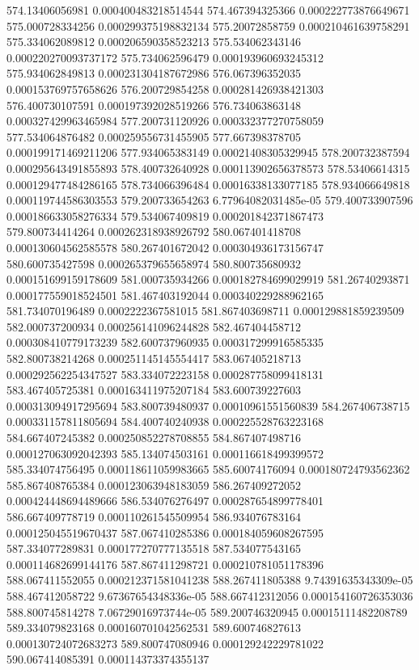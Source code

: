 {574.13406056981 0.000400483218514544
574.467394325366 0.000222773876649671
575.000728334256 0.000299375198832134
575.20072858759 0.000210461639758291
575.334062089812 0.000206590358523213
575.534062343146 0.000220270093737172
575.734062596479 0.000193960693245312
575.934062849813 0.000231304187672986
576.067396352035 0.000153769757658626
576.200729854258 0.000281426938421303
576.400730107591 0.000197392028519266
576.734063863148 0.000327429963465984
577.200731120926 0.000332377270758059
577.534064876482 0.000259556731455905
577.667398378705 0.000199171469211206
577.934065383149 0.00021408305329945
578.200732387594 0.000295643491855893
578.400732640928 0.000113902656378573
578.53406614315 0.000129477484286165
578.734066396484 0.00016338133077185
578.934066649818 0.000119744586303553
579.200733654263 6.77964082031485e-05
579.400733907596 0.000186633058276334
579.534067409819 0.000201842371867473
579.800734414264 0.000262318938926792
580.067401418708 0.000130604562585578
580.267401672042 0.000304936173156747
580.600735427598 0.000265379655658974
580.800735680932 0.000151699159178609
581.000735934266 0.000182784699029919
581.26740293871 0.000177559018524501
581.467403192044 0.000340229288962165
581.734070196489 0.0002222367581015
581.867403698711 0.000129881859239509
582.000737200934 0.000256141096244828
582.467404458712 0.000308410779173239
582.600737960935 0.000317299916585335
582.800738214268 0.000251145145554417
583.067405218713 0.000292562254347527
583.334072223158 0.000287758099418131
583.467405725381 0.000163411975207184
583.600739227603 0.000313094917295694
583.800739480937 0.00010961551560839
584.267406738715 0.000331157811805694
584.400740240938 0.000225528763223168
584.667407245382 0.000250852278708855
584.867407498716 0.000127063092042393
585.134074503161 0.000116618499399572
585.334074756495 0.000118611059983665
585.60074176094 0.000180724793562362
585.867408765384 0.000123063948183059
586.267409272052 0.000424448694489666
586.534076276497 0.000287654899778401
586.667409778719 0.000110261545509954
586.934076783164 0.000125045519670437
587.067410285386 0.000184059608267595
587.334077289831 0.000177270777135518
587.534077543165 0.000114682699144176
587.867411298721 0.000210781051178396
588.067411552055 0.000212371581041238
588.267411805388 9.74391635343309e-05
588.467412058722 9.67367654348336e-05
588.667412312056 0.000154160726353036
588.800745814278 7.06729016973744e-05
589.200746320945 0.00015111482208789
589.334079823168 0.000160701042562531
589.600746827613 0.000130724072683273
589.800747080946 0.000129242229781022
590.067414085391 0.000114373374355137
}
